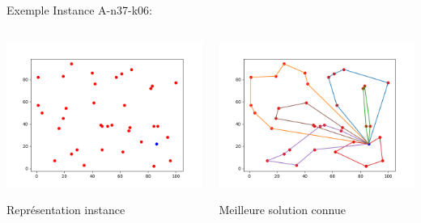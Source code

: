 \documentclass{beamer}
\begin{document}
\begin{frame}{Exemple}
Instance A-n37-k06:
 \begin{columns}[t]
  \begin{column}{5cm}
  	\centering
	\includegraphics[scale=0.32]{instanceA3706.png}
	
	Représentation instance 
  \end{column}
  
  \begin{column}{5cm}
  	\centering
	\includegraphics[scale=0.32]{bestA3706.png}
 
 	Meilleure solution connue
  \end{column}
 \end{columns}

\end{frame}
\end{document}
